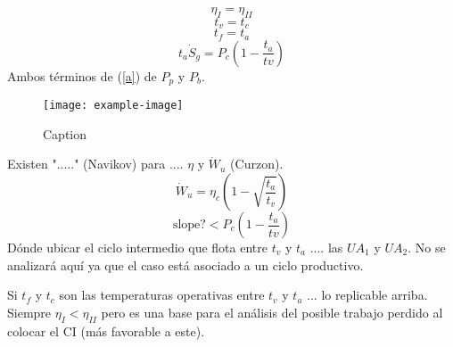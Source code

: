 \documentclass{article}
\begin{document}
\begin{equation*}
    \eta_I=\eta_{II}
\end{equation*}
\begin{equation*}
    t_v=t_c
\end{equation*}
\begin{equation*}
    t_f=t_a
\end{equation*}
\begin{equation}
    t_a\dot{S}_g=P_c\left(1-\frac{t_a}{tv}\right) \label{a}
\end{equation}
Ambos términos de (\ref{a}) de $P_p$ y $P_b$.
\begin{figure}[H]
    \centering
    \texttt{[image: example-image]}
    \caption{Caption}
\end{figure}
Existen "....." (Navikov) para .... $\eta$ y $\dot{W}_u$ (Curzon).
\begin{equation}
    \dot{W}_u=\eta_c\left(1-\sqrt{\frac{t_a}{t_v}}\right)
\end{equation}
\begin{equation}
    \text{slope?}<P_c\left(1-\frac{t_a}{tv}\right)
\end{equation}
Dónde ubicar el ciclo intermedio que flota entre $t_v$ y $t_a$ .... las $UA_1$ y $UA_2$. No se analizará aquí ya que el caso está asociado a un ciclo productivo.

Si $t_f$ y $t_c$ son las temperaturas operativas entre $t_v$ y $t_a$ ... lo replicable arriba. Siempre $\eta_I<\eta_{II}$ pero es una base para el análisis del posible trabajo perdido al colocar el CI (más favorable a este).
\end{document}
